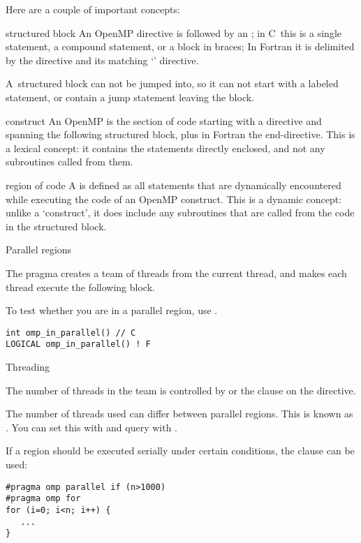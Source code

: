 Here are a couple of important concepts:
\begin{definition}
\item[structured block] An OpenMP directive is followed by an
  ; in C~this is a single statement, a
  compound statement, or a block in braces; In Fortran it is
  delimited by the directive and its matching `' directive.

  A~structured block can not be jumped into, so it can not start with a
  labeled statement, or contain a jump statement leaving the block.
\item[construct] An OpenMP  is the section of code
  starting with a directive and spanning the following structured block,
  plus in Fortran the end-directive. This is a lexical concept: it contains
  the statements directly enclosed, and not any subroutines called from them.
\item[region of code] A  is defined as all statements
  that are dynamically encountered while executing the code of an OpenMP construct.
  This is a dynamic concept: unlike a `construct', it does include any subroutines
  that are called from the code in the structured block.
\end{definition}

 {Parallel regions}

The  pragma creates a team of threads from the current thread,
and makes each thread execute the following block.

To test whether you are in a parallel region, use
.
\begin{verbatim}
int omp_in_parallel() // C
LOGICAL omp_in_parallel() ! F
\end{verbatim}

 {Threading}

The number of threads in the team is controlled by 
or the  clause on the  directive.

The number of threads used can differ between parallel regions. This is known
as . You can set this with
 and query with
.

If a region should be executed serially under certain conditions,
the  clause can be used:
\begin{verbatim}
#pragma omp parallel if (n>1000)
#pragma omp for
for (i=0; i<n; i++) {
   ...
}
\end{verbatim}

